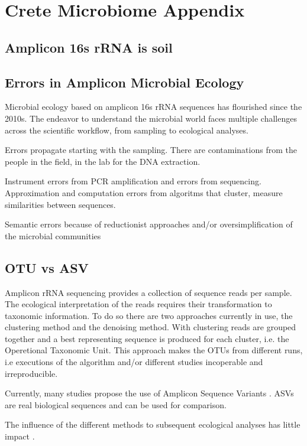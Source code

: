 
\chapter{Crete Microbiome Appendix} %

\label{AppendixC} 

\section{Amplicon 16s rRNA is soil}

\section{Errors in Amplicon Microbial Ecology}

Microbial ecology based on amplicon 16s rRNA sequences has flourished since the
2010s. The endeavor to understand the microbial world faces multiple challenges
across the scientific workflow, from sampling to ecological analyses.

Errors propagate starting with the sampling. There are contaminations from the
people in the field, in the lab for the DNA extraction. 

Instrument errors from PCR amplification and errors from sequencing.
Approximation and computation errors from algoritms that cluster, measure similarities between
sequences.

Semantic errors because of reductionist approaches and/or oversimplification
of the microbial communities

\section{OTU vs ASV}

Amplicon rRNA sequencing provides a collection of sequence reads per sample. 
The ecological interpretation of the reads requires their transformation to
taxonomic information. To do so there are two approaches currently in use, 
the clustering method and the denoising method. With clustering reads are 
grouped together and a best representing sequence is produced for each 
cluster, i.e. the Operetional Taxonomic Unit. This approach makes the OTUs 
from different runs, i.e executions of the algorithm and/or different studies
incoperable and irreproducible.

Currently, many studies propose the use of Amplicon Sequence Variants \citep{Callahan2017}. 
ASVs are real biological sequences and can be used for comparison.

The influence of the different methods to subsequent ecological analyses has
little impact \citep{Glassman2018}.

